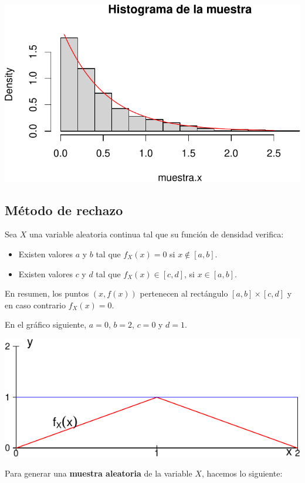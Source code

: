 \documentclass[
  letterpaper,
  DIV=11,
  numbers=noendperiod]{scrreprt}
\providecommand{\tightlist}{%
  \setlength{\itemsep}{0pt}\setlength{\parskip}{0pt}}\usepackage{longtable,booktabs,array}
\begin{document}
\includegraphics{4_files/figure-pdf/unnamed-chunk-8-1.pdf}

\hypertarget{muxe9todo-de-rechazo}{%
\subsection{Método de rechazo}\label{muxe9todo-de-rechazo}}

Sea \(X\) una variable aleatoria continua tal que su función de densidad
verifica:

\begin{itemize}
\tightlist
\item
  Existen valores \(a\) y \(b\) tal que \(f_X(x)= 0\) si
  \(x\not\in [a,b]\).
\item
  Existen valores \(c\) y \(d\) tal que \(f_X(x)\in [c,d]\), si
  \(x\in [a,b]\).
\end{itemize}

En resumen, los puntos \((x,f(x))\) pertenecen al rectángulo
\([a,b]\times [c,d]\) y en caso contrario \(f_X(x)=0\).

En el gráfico siguiente, \(a=0\), \(b=2\), \(c=0\) y \(d=1\).

\includegraphics{4_files/figure-pdf/unnamed-chunk-9-1.pdf}

Para generar una \textbf{muestra aleatoria} de la variable \(X\),
hacemos lo siguiente:
\end{document}
